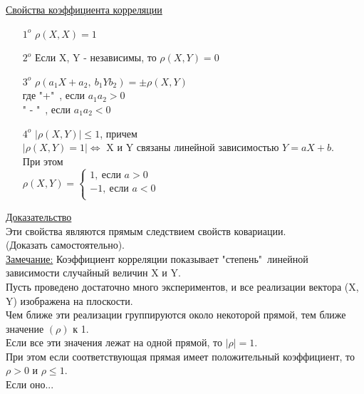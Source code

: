 \underline{Свойства коэффициента корреляции}\\
\begin{enumerate}
	\item[$1^o$] $\rho(X, X) = 1$
	\item[$2^o$] Если X, Y - независимы, то $\rho(X, Y) = 0$
	\item[$3^o$] $\rho(a_1 X + a_2, \ b_1 Y b_2) = \pm \rho(X, Y)$\\
	где "+"\ , если $a_1 a_2 > 0$\\
	" - "\  , если $a_1 a_2 < 0$
	
	\item[$4^o$] $|\rho(X, Y)| \leqslant 1$, причем\\
	$|\rho(X, Y) = 1| \Leftrightarrow$ X и Y связаны линейной зависимостью $Y = aX + b$.\\
	При этом \\
	$\rho(X, Y) = 
	\begin{cases}
		1, \ \text{если } a > 0 \\
		-1, \ \text{если } a < 0 \\
	\end{cases}$\\
\end{enumerate}


\underline{Доказательство}\\
Эти свойства являются прямым следствием свойств ковариации.\\
(Доказать самостоятельно).\\


\underline{Замечание:} Коэффициент корреляции показывает "степень"\ линейной зависимости случайный величин X и Y.\\
Пусть проведено достаточно много экспериментов, и все реализации вектора (X, Y) изображена на плоскости.\\
Чем ближе эти реализации группируются около некоторой прямой, тем ближе значение $(\rho)$ к 1.\\
Если все эти значения лежат на одной прямой, то $|\rho| = 1$.\\
При этом если соответствующая прямая имеет положительный коэффициент, то $\rho > 0$ и $\rho \leqslant 1$. \\
Если оно...


